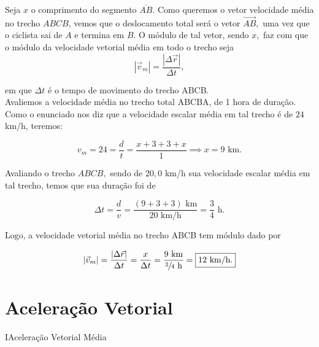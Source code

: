 \begin{exemplo}
\resolucao

Seja $x$ o comprimento do segmento $\overline{AB}$. Como queremos o vetor velocidade média no trecho $ABCB$, vemos que o deslocamento total será o vetor $\overrightarrow{AB},$ uma vez que o ciclista sai de $A$ e termina em $B$. O módulo de tal vetor, sendo $x,$ faz com que o módulo da velocidade vetorial média em todo o trecho seja
$$ |\vec{v}_m| = \dfrac{|\Delta \vec{r}|}{\Delta t},$$

\noindent em que $\Delta t$ é o tempo de movimento do trecho ABCB.\\

Avaliemos a velocidade média no trecho total ABCBA, de 1 hora de duração. Como o enunciado nos diz que a velocidade escalar média em tal trecho é de $24$ km/h, teremos:

$$ v_m = 24 = \dfrac{d}{t} = \dfrac{x+3+3+x}{1} \implies x = 9 \text{ km.}$$

Avaliando o trecho $ABCB,$ sendo de $20,0$ km/h sua velocidade escalar média em tal trecho, temos que sua duração foi de

$$\Delta t = \dfrac{d}{v} = \dfrac{(9+3+3) \text{ km}}{20 \text{ km/h}}= \dfrac{3}{4} \text{ h.}$$

Logo, a velocidade vetorial média no trecho ABCB tem módulo dado por

  $$ |\vec{v}_m| = \dfrac{|\Delta \vec{r}|}{\Delta t} = \dfrac{x}{\Delta t}=\dfrac{9 \text{ km}}{\sfrac{3}{4} \text{ h} } = \boxed{12 \text{ km/h.}}$$
    
\end{exemplo}


\vspace{0.3cm}










\section{Aceleração Vetorial}






\begin{secnivel}{I}{Aceleração Vetorial Média}
  

\end{secnivel}




